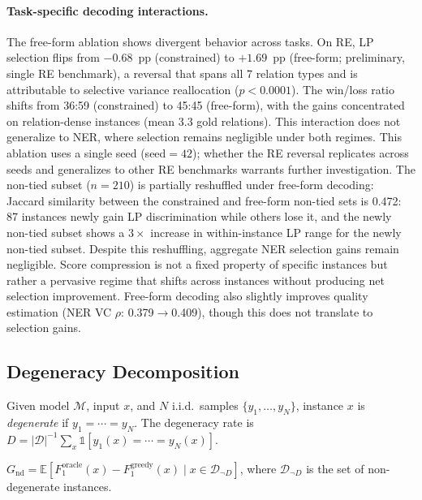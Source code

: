\paragraph{Task-specific decoding interactions.}
The free-form ablation shows divergent behavior across tasks.
On RE, LP selection flips from $-0.68$~pp (constrained) to $+1.69$~pp (free-form; preliminary, single RE benchmark), a reversal that spans all 7 relation types and is attributable to selective variance reallocation ($p{<}0.0001$).
The win/loss ratio shifts from 36:59 (constrained) to 45:45 (free-form), with the gains concentrated on relation-dense instances (mean 3.3 gold relations).
This interaction does not generalize to NER, where selection remains negligible under both regimes.
This ablation uses a single seed (seed${=}42$); whether the RE reversal replicates across seeds and generalizes to other RE benchmarks warrants further investigation.
The non-tied subset ($n{=}210$) is partially reshuffled under free-form decoding: Jaccard similarity between the constrained and free-form non-tied sets is 0.472: 87 instances newly gain LP discrimination while others lose it, and the newly non-tied subset shows a $3{\times}$ increase in within-instance LP range for the newly non-tied subset.
Despite this reshuffling, aggregate NER selection gains remain negligible. Score compression is not a fixed property of specific instances but rather a pervasive regime that shifts across instances without producing net selection improvement.
Free-form decoding also slightly improves quality estimation (NER VC $\rho$: 0.379$\to$0.409), though this does not translate to selection gains.

\subsection{Degeneracy Decomposition}\label{app:bound_proof}

\begin{definition}
Given model $\mathcal{M}$, input $x$, and $N$ i.i.d.\ samples $\{y_1, \ldots, y_N\}$, instance $x$ is \emph{degenerate} if $y_1 = \cdots = y_N$. The degeneracy rate is $D = |\mathcal{D}|^{-1} \sum_{x} \mathbb{1}[y_1(x) = \cdots = y_N(x)]$.
\end{definition}

\begin{definition}
$G_{\text{nd}} = \mathbb{E}[F_1^{\text{oracle}}(x) - F_1^{\text{greedy}}(x) \mid x \in \mathcal{D}_{\neg D}]$, where $\mathcal{D}_{\neg D}$ is the set of non-degenerate instances.
\end{definition}

